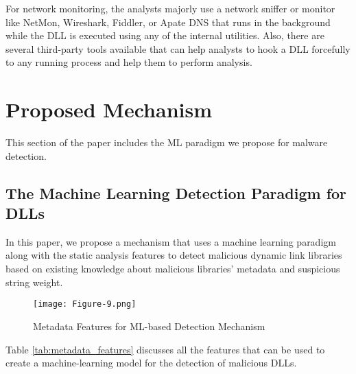 \documentclass{article}
\begin{document}
For network monitoring, the analysts majorly use a network sniffer or monitor like NetMon, Wireshark, Fiddler, or Apate DNS that runs in the background while the DLL is executed using any of the internal utilities. Also, there are several third-party tools available that can help analysts to hook a DLL forcefully to any running process and help them to perform analysis.

\section{Proposed Mechanism}

This section of the paper includes the ML paradigm we propose for malware detection.

\subsection{The Machine Learning Detection Paradigm for DLLs}

In this paper, we propose a mechanism that uses a machine learning paradigm along with the static analysis features to detect malicious dynamic link libraries based on existing knowledge about malicious libraries’ metadata and suspicious string weight.

\begin{figure}[h]
    \centering
    \texttt{[image: Figure-9.png]}
    \caption{Metadata Features for ML-based Detection Mechanism}
\end{figure}

Table \ref{tab:metadata_features} discusses all the features that can be used to create a machine-learning model for the detection of malicious DLLs.
\end{document}
